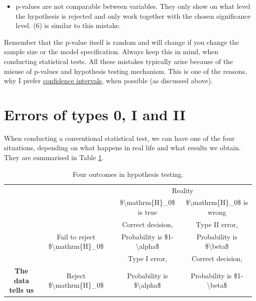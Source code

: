 \documentclass[
]{book}
\providecommand{\tightlist}{%
  \setlength{\itemsep}{0pt}\setlength{\parskip}{0pt}}
\theoremstyle{definition}
\theoremstyle{definition}
\theoremstyle{definition}
\theoremstyle{definition}
\theoremstyle{remark}
\begin{document}
\begin{itemize}
\tightlist
\item
  p-values are not comparable between variables. They only show on what level the hypothesis is rejected and only work together with the chosen significance level. (6) is similar to this mistake.
\end{itemize}

Remember that the p-value itself is random and will change if you change the sample size or the model specification. Always keep this in mind, when conducting statistical tests. All these mistakes typically arise because of the misuse of p-values and hypothesis testing mechanism. This is one of the reasons, why I prefer \protect\hyperlink{confidenceIntervals}{confidence intervals}, when possible (as discussed above).

\hypertarget{typeErrors}{%
\section{Errors of types 0, I and II}\label{typeErrors}}

When conducting a conventional statistical test, we can have one of the four situations, depending on what happens in real life and what results we obtain. They are summarised in Table \ref{tab:typeErrorsTable}.

\begin{table}

\caption{\label{tab:typeErrorsTable}Four outcomes in hypothesis testing.}
\centering
\fontsize{12}{14}\selectfont
\begin{tabular}[t]{>{}c|c|c|c}
\hline
\multicolumn{2}{c|}{ } & \multicolumn{2}{c}{Reality} \\
\cline{3-4}
 &  & \$\textbackslash{}mathrm\{H\}\_0\$ is true & \$\textbackslash{}mathrm\{H\}\_0\$ is wrong\\
\hline
 &  & Correct decision, & Type II error,\\
\cline{3-4}
 & \multirow{-2}{*}{\centering\arraybackslash Fail to reject \$\textbackslash{}mathrm\{H\}\_0\$} & Probability is \$1-\textbackslash{}alpha\$ & Probability is \$\textbackslash{}beta\$\\
\cline{2-4}
 &  & Type I error, & Correct decision,\\
\cline{3-4}
\multirow{-4}{*}{\centering\arraybackslash \textbf{The data tells us}} & \multirow{-2}{*}{\centering\arraybackslash Reject \$\textbackslash{}mathrm\{H\}\_0\$} & Probability is \$\textbackslash{}alpha\$ & Probability is \$1-\textbackslash{}beta\$\\
\hline
\end{tabular}
\end{table}
\end{document}
